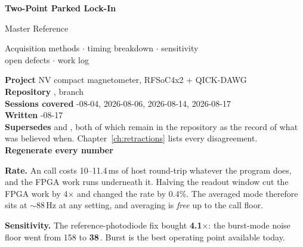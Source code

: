 



\begin{titlepage}
\centering
\vspace*{2.4cm}
{\Huge\bfseries\color{accent} Two-Point Parked Lock-In\par}
\vspace{0.5cm}
{\LARGE\color{accent} Master Reference\par}
\vspace{1.1cm}
{\large Acquisition methods $\cdot$ timing breakdown $\cdot$ sensitivity\\
open defects $\cdot$ work log\par}
\vspace{2.0cm}

\begin{minipage}{0.82\textwidth}
\small
\raggedright
\textbf{Project} \quad NV compact magnetometer, RFSoC4x2 + QICK-DAWG\\
\textbf{Repository} \quad {}, branch \\
\textbf{Sessions covered} -08-04, 2026-08-06, 2026-08-14, 2026-08-17\\
\textbf{Written} -08-17\\[0.7em]
\textbf{Supersedes} \quad
{} and
,
both of which remain in the repository as the record of what was believed when.
Chapter~\ref{ch:retractions} lists every disagreement.\\[0.7em]
\textbf{Regenerate every number} \quad {}
\end{minipage}

\vfill

\begin{minipage}{0.82\textwidth}
\begin{keybox}
\small
\textbf{Rate.} An  call costs 10--11.4\,ms of host round-trip whatever
the program does, and the FPGA work runs underneath it. Halving the readout window
cut the FPGA work by 4$\times$ and changed the rate by 0.4\%. The averaged mode
therefore sits at $\sim$88\,Hz at any setting, and averaging is \emph{free} up to the
call floor.

\textbf{Sensitivity.} The reference-photodiode fix bought \textbf{4.1$\times$}: the
burst-mode noise floor went from 158 to \textbf{38\,\etaunit}. Burst is the best
operating point available today.


\end{keybox}
\end{minipage}
\end{titlepage}
